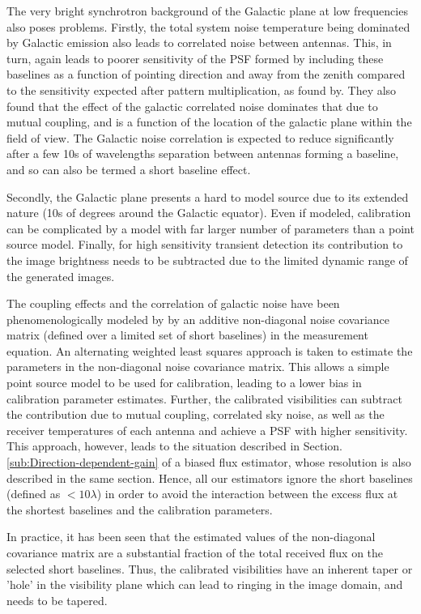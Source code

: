 \documentclass{aa}
\begin{document}
The very bright synchrotron background of the Galactic plane at low
frequencies also poses problems. Firstly, the total system noise temperature
being dominated by Galactic emission also leads to correlated noise
between antennas. This, in turn, again leads to poorer sensitivity
of the PSF formed by including these baselines as a function of pointing
direction and away from the zenith compared to the sensitivity expected
after pattern multiplication, as found by\citep{ellingson2011sensitivity}.
They also found that the effect of the galactic correlated noise dominates
that due to mutual coupling, and is a function of the location of
the galactic plane within the field of view. The Galactic noise correlation
is expected to reduce significantly after a few 10s of wavelengths
separation between antennas forming a baseline, and so can also be
termed a short baseline effect.

Secondly, the Galactic plane presents a hard to model source due to
its extended nature (10s of degrees around the Galactic equator).
Even if modeled, calibration can be complicated by a model with far
larger number of parameters than a point source model. Finally, for
high sensitivity transient detection its contribution to the image
brightness needs to be subtracted due to the limited dynamic range
of the generated images.

The coupling effects and the correlation of galactic noise have been
phenomenologically modeled by \citep{wijnholds2010self} by an additive
non-diagonal noise covariance matrix (defined over a limited set of
short baselines) in the measurement equation. An alternating weighted
least squares approach is taken to estimate the parameters in the
non-diagonal noise covariance matrix. This allows a simple point source
model to be used for calibration, leading to a lower bias in calibration
parameter estimates. Further, the calibrated visibilities can subtract
the contribution due to mutual coupling, correlated sky noise, as
well as the receiver temperatures of each antenna and achieve a PSF
with higher sensitivity. This approach, however, leads to the situation
described in Section. \ref{sub:Direction-dependent-gain} of a biased
flux estimator, whose resolution is also described in the same section.
Hence, all our estimators ignore the short baselines (defined as $<10\lambda$)
in order to avoid the interaction between the excess flux at the shortest
baselines and the calibration parameters.

In practice, it has been seen that the estimated values of the non-diagonal
covariance matrix are a substantial fraction of the total received
flux on the selected short baselines. Thus, the calibrated visibilities
have an inherent taper or 'hole' in the visibility plane which can
lead to ringing in the image domain, and needs to be tapered. 
\end{document}
